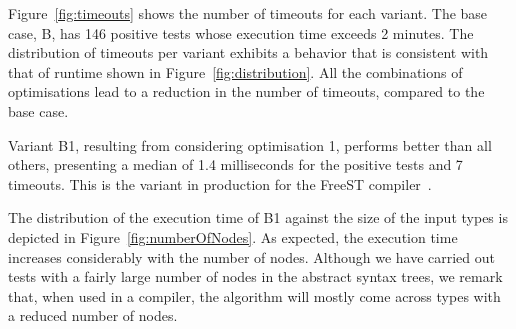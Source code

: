 Figure~\ref{fig:timeouts} shows the number of timeouts for each
variant.  The base case, B, has 146 positive tests whose execution
time exceeds 2 minutes. 
The distribution of timeouts per variant exhibits a behavior that
is consistent 
with that of runtime shown in Figure~\ref{fig:distribution}.
All the combinations of optimisations lead to a reduction in the
number of timeouts, compared to the base case.

Variant B1,
resulting from considering optimisation 1, performs better than all
others, presenting a median of 1.4 milliseconds for the positive tests
and 7 timeouts. This is the variant in production for the FreeST 
compiler~\cite{almeida.etal_freest-functional-language}.

The distribution of the execution time of B1 against the size of the
input types is depicted in Figure~\ref{fig:numberOfNodes}.  As
expected, the execution time increases considerably with the number of
nodes.
%
Although we have carried out tests with a fairly large number of nodes
in the abstract syntax trees, we remark that, when used in a compiler,
the algorithm will mostly come across types with a reduced number of
nodes.

